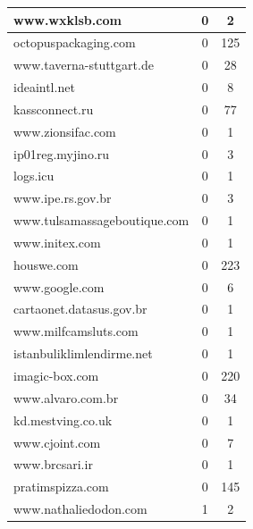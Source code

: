 \documentclass[a4paper, 11pt, oneside]{report}
\begin{document}
\begin{longtable}[!ht]{|l|c|c|}
\hline
www.wxklsb.com&0&2\\
\hline
octopuspackaging.com&0&125\\
\hline
www.taverna-stuttgart.de&0&28\\
\hline
ideaintl.net&0&8\\
\hline
kassconnect.ru&0&77\\
\hline
www.zionsifac.com&0&1\\
\hline
ip01reg.myjino.ru&0&3\\
\hline
logs.icu&0&1\\
\hline
www.ipe.rs.gov.br&0&3\\
\hline
www.tulsamassageboutique.com&0&1\\
\hline
www.initex.com&0&1\\
\hline
houswe.com&0&223\\
\hline
www.google.com&0&6\\
\hline
cartaonet.datasus.gov.br&0&1\\
\hline
www.milfcamsluts.com&0&1\\
\hline
istanbuliklimlendirme.net&0&1\\
\hline
imagic-box.com&0&220\\
\hline
www.alvaro.com.br&0&34\\
\hline
kd.mestving.co.uk&0&1\\
\hline
www.cjoint.com&0&7\\
\hline
www.brcsari.ir&0&1\\
\hline
pratimspizza.com&0&145\\
\hline
www.nathaliedodon.com&1&2\\
\hline
\end{longtable}




\end{document}
